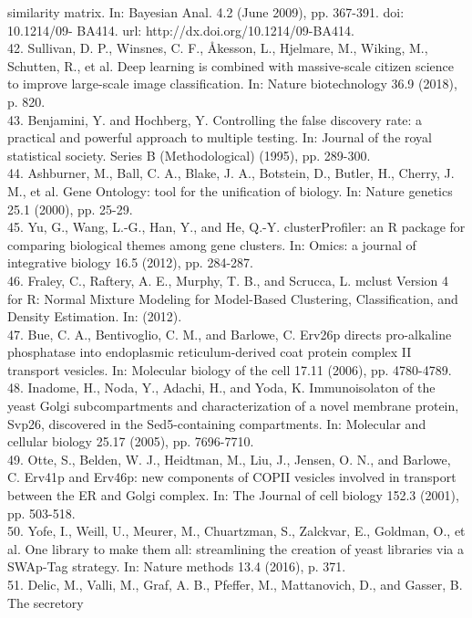 \documentclass[12pt,english]{article}
\begin{document}
similarity matrix. In: Bayesian Anal. 4.2 (June 2009), pp. 367-391. doi: 10.1214/09-
BA414. url: http://dx.doi.org/10.1214/09-BA414.
\\
42. Sullivan, D. P., Winsnes, C. F., Åkesson, L., Hjelmare, M., Wiking, M., Schutten, R., et
al. Deep learning is combined with massive-scale citizen science to improve large-scale
image classification. In: Nature biotechnology 36.9 (2018), p. 820.
\\
43. Benjamini, Y. and Hochberg, Y. Controlling the false discovery rate: a practical and
powerful approach to multiple testing. In: Journal of the royal statistical society. Series
B (Methodological) (1995), pp. 289-300.
\\
44. Ashburner, M., Ball, C. A., Blake, J. A., Botstein, D., Butler, H., Cherry, J. M., et al.
Gene Ontology: tool for the unification of biology. In: Nature genetics 25.1 (2000),
pp. 25-29.
\\
45. Yu, G., Wang, L.-G., Han, Y., and He, Q.-Y. clusterProfiler: an R package for comparing
biological themes among gene clusters. In: Omics: a journal of integrative biology
16.5 (2012), pp. 284-287.
\\
46. Fraley, C., Raftery, A. E., Murphy, T. B., and Scrucca, L. mclust Version 4 for R:
Normal Mixture Modeling for Model-Based Clustering, Classification, and Density Estimation. In: (2012).
\\
47. Bue, C. A., Bentivoglio, C. M., and Barlowe, C. Erv26p directs pro-alkaline phosphatase
into endoplasmic reticulum-derived coat protein complex II transport vesicles.
In: Molecular biology of the cell 17.11 (2006), pp. 4780-4789.
\\
48. Inadome, H., Noda, Y., Adachi, H., and Yoda, K. Immunoisolaton of the yeast Golgi
subcompartments and characterization of a novel membrane protein, Svp26, discovered
in the Sed5-containing compartments. In: Molecular and cellular biology 25.17 (2005),
pp. 7696-7710.
\\
49. Otte, S., Belden, W. J., Heidtman, M., Liu, J., Jensen, O. N., and Barlowe, C. Erv41p
and Erv46p: new components of COPII vesicles involved in transport between the ER
and Golgi complex. In: The Journal of cell biology 152.3 (2001), pp. 503-518.
\\
50. Yofe, I., Weill, U., Meurer, M., Chuartzman, S., Zalckvar, E., Goldman, O., et al. One
library to make them all: streamlining the creation of yeast libraries via a SWAp-Tag
strategy. In: Nature methods 13.4 (2016), p. 371.
\\
51. Delic, M., Valli, M., Graf, A. B., Pfeffer, M., Mattanovich, D., and Gasser, B. The secretory
\end{document}

